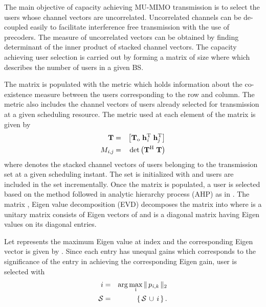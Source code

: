 
The main objective of capacity achieving MU-MIMO transmission is to select the users whose channel vectors are uncorrelated. Uncorrelated channels can be de-coupled easily to facilitate interference free transmission with the use of precoders. The measure of uncorrelated vectors can be obtained by finding determinant of the inner product of stacked  channel vectors. The capacity achieving user selection is carried out by forming a matrix  of size  where  which describes the number of users in a given BS.

The matrix  is populated with the metric which holds information about the co-existence measure between the users corresponding to the  row and  column. The metric also includes the channel vectors of users already selected for transmission at a given scheduling resource. The metric used at each element of the matrix  is given by
\begin{eqnarray}
\mathbf{T} &=& \left [ \mathbf{T}_{\mathrm{o}} \; \mathbf{h}_{\mathit{i}}^{\mathrm{T}} \; \mathbf{h}_{\mathit{j}}^{\mathrm{T}}  \right ] \\
{M}_{\mathit{i},\mathit{j}} &=& \det{\left ( \mathbf{T}^{\mathrm{H}} \; \mathbf{T} \right )} \label{mca1-e1:2}
\label{mca1-e1}
\end{eqnarray}
where  denotes the stacked channel vectors of users belonging to the transmission set  at a given scheduling instant. The set  is initialized with \me{\emptyset} and users are included in the set incrementally. Once the matrix  is populated, a user is selected based on the method followed in analytic hierarchy process (AHP) as in \cite{saaty2008decision}. The matrix , Eigen value decomposition (EVD) decomposes the matrix into  where  is a unitary matrix consists of Eigen vectors of  and  is a diagonal matrix having Eigen values on its diagonal entries.

Let  represents the maximum Eigen value at  index and the corresponding Eigen vector is given by . Since each entry  has unequal gains which corresponds to the significance of the entry in achieving the corresponding Eigen gain, user  is selected with
\begin{eqnarray}
i &=& \arg \max_{\mathrm{i}} \|\, {p}_{\mathit{i},\mathit{k}} \,\|_{2} \label{mca1-e2:1} \\
\mathcal{S} &=& \left \lbrace \, \mathcal{S} \, \cup \, i \, \right \rbrace.
\label{mca1-e2}
\end{eqnarray}

